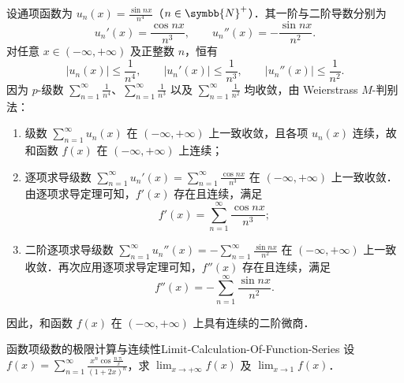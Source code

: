 \begin{myproof}
    设通项函数为 $u_n(x) = \frac{\sin nx}{n^4}$（$n \in \symbb{N}^+$）．其一阶与二阶导数分别为
    \begin{equation}
        u_n'(x) = \frac{\cos nx}{n^3}, \qquad u_n''(x) = -\frac{\sin nx}{n^2}.
    \end{equation}
    对任意 $x \in (-\infty, +\infty)$ 及正整数 $n$，恒有
    \begin{equation}
        |u_n(x)| \leqslant \frac{1}{n^4}, \qquad |u_n'(x)| \leqslant \frac{1}{n^3}, \qquad |u_n''(x)| \leqslant \frac{1}{n^2}.
    \end{equation}
    因为 $p$-级数 $\sum_{n=1}^\infty \frac{1}{n^4}$、$\sum_{n=1}^\infty \frac{1}{n^3}$ 以及 $\sum_{n=1}^\infty \frac{1}{n^2}$ 均收敛，由 Weierstrass $M$-判别法：
    \begin{enumerate}
        \item 级数 $\sum_{n=1}^\infty u_n(x)$ 在 $(-\infty, +\infty)$ 上一致收敛，且各项 $u_n(x)$ 连续，故和函数 $f(x)$ 在 $(-\infty, +\infty)$ 上连续；
        \item 逐项求导级数 $\sum_{n=1}^\infty u_n'(x) = \sum_{n=1}^\infty \frac{\cos nx}{n^3}$ 在 $(-\infty, +\infty)$ 上一致收敛．由逐项求导定理可知，$f'(x)$ 存在且连续，满足
              \begin{equation}
                  f'(x) = \sum_{n=1}^\infty \frac{\cos nx}{n^3};
              \end{equation}
        \item 二阶逐项求导级数 $\sum_{n=1}^\infty u_n''(x) = -\sum_{n=1}^\infty \frac{\sin nx}{n^2}$ 在 $(-\infty, +\infty)$ 上一致收敛．再次应用逐项求导定理可知，$f''(x)$ 存在且连续，满足
              \begin{equation}
                  f''(x) = -\sum_{n=1}^\infty \frac{\sin nx}{n^2}.
              \end{equation}
    \end{enumerate}
    因此，和函数 $f(x)$ 在 $(-\infty, +\infty)$ 上具有连续的二阶微商．
\end{myproof}

\begin{problem}{函数项级数的极限计算与连续性}{Limit-Calculation-Of-Function-Series}
    设 $f(x) = \sum_{n=1}^\infty \frac{x^n \cos \frac{n\uppi}{x}}{(1 + 2x)^n}$，求 $\lim_{x\to +\infty} f(x)$ 及 $\lim_{x\to 1} f(x)$．
\end{problem}

